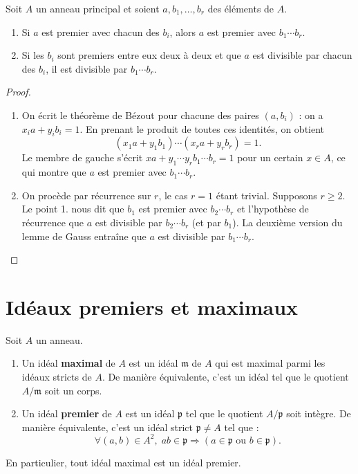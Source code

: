 \documentclass[]{report}
\begin{document}
\begin{prop}{}{}
    Soit $A$ un anneau principal et soient $a, b_1, \dots, b_r$ des éléments de $A$.
    \begin{enumerate}
        \item Si $a$ est premier avec chacun des $b_i$, alors $a$ est premier avec $b_1 \cdots b_r$.
        \item Si les $b_i$ sont premiers entre eux deux à deux et que $a$ est divisible par chacun des $b_i$, il est divisible par $b_1 \cdots b_r$.
    \end{enumerate}
\end{prop}

\begin{proof}
    \begin{enumerate}
        \item On écrit le théorème de Bézout pour chacune des paires $(a, b_i)$ : on a $x_i a + y_i b_i = 1$. En prenant le produit de toutes ces identités, on obtient
        \[(x_1 a + y_1 b_1) \cdots (x_r a + y_r b_r) = 1.\]
        Le membre de gauche s'écrit $xa + y_1 \cdots y_r b_1 \cdots b_r = 1$ pour un certain $x \in A$, ce qui montre que $a$ est premier avec $b_1 \cdots b_r$.
        \item On procède par récurrence sur $r$, le cas $r = 1$ étant trivial. Supposons $r \ge 2$. Le point 1. nous dit que $b_1$ est premier avec $b_2 \cdots b_r$ et l'hypothèse de récurrence que $a$ est divisible par $b_2 \cdots b_r$ (et par $b_1$). La deuxième version du lemme de Gauss entraîne que $a$ est divisible par $b_1 \cdots b_r$.
    \end{enumerate}
\end{proof}

\section{Idéaux premiers et maximaux}

\begin{df}{}{}
    Soit $A$ un anneau.
    \begin{enumerate}
        \item[(i)] Un idéal \textbf{maximal} de $A$ est un idéal $\mathfrak{m}$ de $A$ qui est maximal parmi les idéaux stricts de $A$. De manière équivalente, c'est un idéal tel que le quotient $A/\mathfrak{m}$ soit un corps.
        \item[(ii)] Un idéal \textbf{premier} de $A$ est un idéal $\mathfrak{p}$ tel que le quotient $A/\mathfrak{p}$ soit intègre. De manière équivalente, c'est un idéal strict $\mathfrak{p} \neq A$ tel que :
        \[\forall (a, b) \in A^2, \; ab \in \mathfrak{p} \Rightarrow (a \in \mathfrak{p} \text{ ou } b \in \mathfrak{p}).\]
    \end{enumerate}
    En particulier, tout idéal maximal est un idéal premier.
\end{df}
\end{document}
